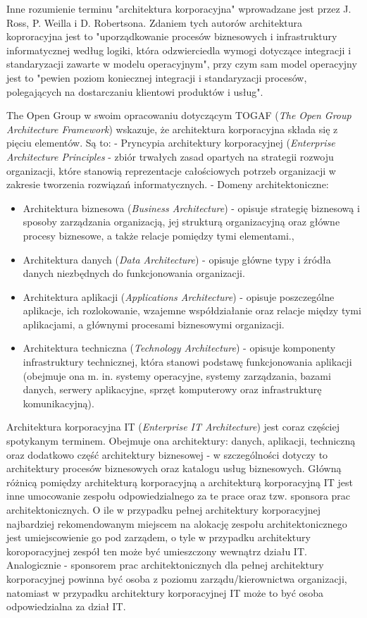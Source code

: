 Inne rozumienie terminu "architektura korporacyjna" wprowadzane jest przez J. Ross, P. Weilla i D. Robertsona. Zdaniem tych autorów architektura koproracyjna jest to "uporządkowanie procesów biznesowych i infrastruktury informatycznej według logiki, która odzwierciedla wymogi dotyczące integracji i standaryzacji zawarte w modelu operacyjnym", przy czym sam model operacyjny jest to "pewien poziom koniecznej integracji i standaryzacji procesów, polegających na dostarczaniu klientowi produktów i usług".

The Open Group w swoim opracowaniu dotyczącym TOGAF (\textit{The Open Group Architecture Framework}) wskazuje, że architektura korporacyjna składa się z pięciu elementów. Są to:
- Pryncypia architektury korporacyjnej (\textit{Enterprise Architecture Principles} - zbiór trwałych zasad opartych na strategii rozwoju organizacji, które stanowią reprezentacje całościowych potrzeb organizacji w zakresie tworzenia rozwiązań informatycznych.
- Domeny architektoniczne:
\begin{itemize}
\item{Architektura biznesowa (\textit{Business Architecture}) - opisuje strategię biznesową i sposoby zarządzania organizacją, jej strukturą organizacyjną oraz główne procesy biznesowe, a także relacje pomiędzy tymi elementami.},
\item{Architektura danych (\textit{Data Architecture}) - opisuje główne typy i źródła danych niezbędnych do funkcjonowania organizacji.}
\item{Architektura aplikacji (\textit{Applications Architecture}) - opisuje poszczególne aplikacje, ich rozlokowanie, wzajemne współdziałanie oraz relacje między tymi aplikacjami, a głównymi procesami biznesowymi organizacji.}
\item{Architektura techniczna (\textit{Technology Architecture}) - opisuje komponenty infrastruktury technicznej, która stanowi podstawę funkcjonowania aplikacji (obejmuje ona m. in. systemy operacyjne, systemy zarządzania, bazami danych, serwery aplikacyjne, sprzęt komputerowy oraz infrastrukturę komunikacyjną).}
\end{itemize}


Architektura korporacyjna IT (\textit{Enterprise IT Architecture}) jest coraz częściej spotykanym terminem. Obejmuje ona architektury: danych, aplikacji, techniczną oraz dodatkowo część architektury biznesowej - w szczególności dotyczy to architektury procesów biznesowych oraz katalogu usług biznesowych. Główną różnicą pomiędzy architekturą korporacyjną a architekturą korporacyjną IT jest inne umocowanie zespołu odpowiedzialnego za te prace oraz tzw. sponsora prac architektonicznych. O ile w przypadku pełnej architektury korporacyjnej najbardziej rekomendowanym miejscem na alokację zespołu architektonicznego jest umiejscowienie go pod zarządem, o tyle w przypadku architektury koroporacyjnej zespół ten może być umieszczony wewnątrz działu IT. Analogicznie - sponsorem prac architektonicznych dla pełnej architektury korporacyjnej powinna być osoba z poziomu zarządu/kierownictwa organizacji, natomiast w przypadku architektury korporacyjnej IT może to być osoba odpowiedzialna za dział IT. 


